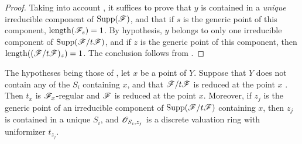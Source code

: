 \begin{proof}
Taking into account , it suffices to prove that $y$ is contained in a \emph{unique} irreducible component of $\operatorname{Supp}(\mathscr{F})$, and that if $s$ is the generic point of this component, $\operatorname{length}(\mathscr{F}_s)=1$.
By hypothesis, $y$ belongs to only one irreducible component of $\operatorname{Supp}(\mathscr{F}/t\mathscr{F})$, and if $z$ is the generic point of this component, then $\operatorname{length}((\mathscr{F}/t\mathscr{F})_z)=1$.
The conclusion follows from .
\end{proof}

\begin{proposition}[3.4.6]
\label{IV.3.4.6}
The hypotheses being those of , let $x$ be a point of $Y$.
Suppose that $Y$ does not contain any of the $S_i$ containing $x$, and that $\mathscr{F}/t\mathscr{F}$ is reduced at the point $x$ .
Then $t_x$ is $\mathscr{F}_x$-regular and $\mathscr{F}$ is reduced at the point $x$.
Moreover, if $z_j$ is the generic point of an irreducible component of $\operatorname{Supp}(\mathscr{F}/t\mathscr{F})$ containing $x$, then $z_j$ is contained in a unique $S_i$, and $\mathscr{O}_{S_i,z_j}$ is a discrete valuation ring with uniformizer $t_{z_j}$.
\end{proposition}

